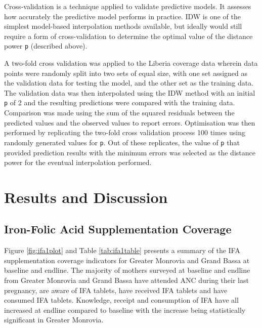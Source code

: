\documentclass[12pt,a4paper]{article}
\begin{document}
Cross-validation is a technique applied to validate predictive models. It assesses how accurately the predictive model performs in practice. IDW is one of the simplest model-based interpolation methods available, but ideally would still require a form of cross-validation to determine the optimal value of the distance power \texttt{p} (described above).

A two-fold cross validation \citep{bivand2008applied} was applied to the Liberia coverage data wherein data points were randomly split into two sets of equal size, with one set assigned as the validation data for testing the model, and the other set as the training data. The validation data was then interpolated using the IDW method with an initial \texttt{p} of 2 and the resulting predictions were compared with the training data. Comparison was made using the sum of the squared residuals between the predicted values and the observed values to report errors. Optimisation was then performed by replicating the two-fold cross validation process 100 times using randomly generated values for \texttt{p}. Out of these replicates, the value of \texttt{p} that provided prediction results with the minimum errors was selected as the distance power for the eventual interpolation performed.

\hypertarget{results-and-discussion}{%
\section{Results and Discussion}\label{results-and-discussion}}

\hypertarget{iron-folic-acid-supplementation-coverage}{%
\subsection{Iron-Folic Acid Supplementation Coverage}\label{iron-folic-acid-supplementation-coverage}}

Figure \ref{fig:ifa1plot} and Table \ref{tab:ifa1table} presents a summary of the IFA supplementation coverage indicators for Greater Monrovia and Grand Bassa at baseline and endline. The majority of mothers surveyed at baseline and endline from Greater Monrovia and Grand Bassa have attended ANC during their last pregnancy, are aware of IFA tablets, have received IFA tablets and have consumed IFA tablets. Knowledge, receipt and consumption of IFA have all increased at endline compared to baseline with the increase being statistically significant in Greater Monrovia.
\end{document}
